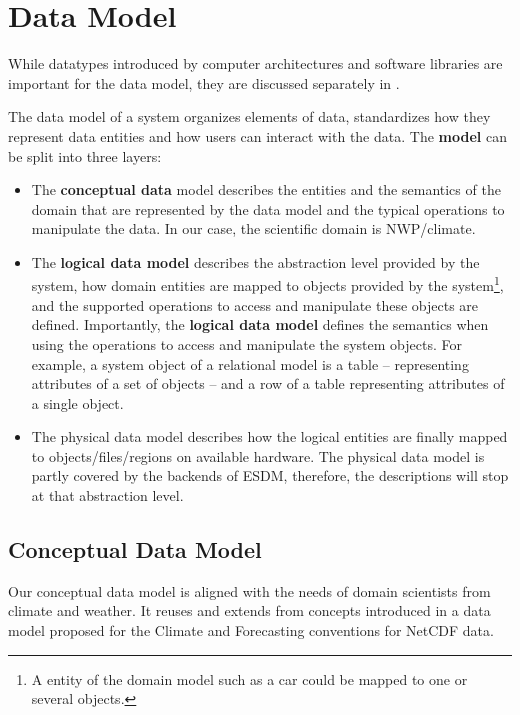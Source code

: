 \section{Data Model}%
\label{data-model}

While datatypes introduced by computer architectures and software
libraries are important for the data model, they are discussed
separately in .

The data model of a system organizes elements of data, standardizes how
they represent data entities and how users can interact with the data.
The \textbf{model} can be split into three layers:

\begin{itemize}
  \item The \textbf{conceptual data} model describes the entities and the
    semantics of the domain that are represented by the data model and the
    typical operations to manipulate the data. In our case, the scientific
    domain is NWP/climate.
  \item The \textbf{logical data model} describes the abstraction level
    provided by the system, how domain entities are mapped to objects
    provided by the system\footnote{A entity of the domain model such as a
    car could be mapped to one or several objects.}, and the supported
    operations to access and manipulate these objects are defined.
    Importantly, the \textbf{logical data model} defines the semantics
    when using the operations to access and manipulate the system objects.
    For example, a system object of a relational model is a table --
    representing attributes of a set of objects -- and a row of a table
    representing attributes of a single object.
  \item The physical data model describes how the logical entities are finally
    mapped to objects/files/regions on available hardware. The physical
    data model is partly covered by the backends of ESDM, therefore, the
    descriptions will stop at that abstraction level.
\end{itemize}

\subsection{Conceptual Data Model}

Our conceptual data model is aligned with the needs of domain scientists
from climate and weather. It reuses and extends from concepts introduced
in a data model proposed for the Climate and Forecasting conventions for
NetCDF data.

